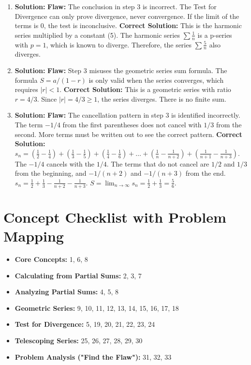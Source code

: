 \documentclass[12pt]{article}
\begin{document}
\begin{enumerate}
    \item \textbf{Solution:}
    \textbf{Flaw:} The conclusion in step 3 is incorrect. The Test for Divergence can only prove divergence, never convergence. If the limit of the terms is 0, the test is inconclusive.
    \textbf{Correct Solution:} This is the harmonic series multiplied by a constant (5). The harmonic series $\sum \frac{1}{n}$ is a p-series with $p=1$, which is known to diverge. Therefore, the series $\sum \frac{5}{n}$ also diverges.

    \item \textbf{Solution:}
    \textbf{Flaw:} Step 3 misuses the geometric series sum formula. The formula $S = a/(1-r)$ is only valid when the series converges, which requires $|r| < 1$.
    \textbf{Correct Solution:} This is a geometric series with ratio $r = 4/3$. Since $|r| = 4/3 \ge 1$, the series diverges. There is no finite sum.

    \item \textbf{Solution:}
    \textbf{Flaw:} The cancellation pattern in step 3 is identified incorrectly. The term $-1/4$ from the first parentheses does not cancel with $1/3$ from the second. More terms must be written out to see the correct pattern.
    \textbf{Correct Solution:}
    $s_n = (\frac{1}{2}-\frac{1}{4}) + (\frac{1}{3}-\frac{1}{5}) + (\frac{1}{4}-\frac{1}{6}) + \dots + (\frac{1}{n}-\frac{1}{n+2}) + (\frac{1}{n+1}-\frac{1}{n+3})$.
    The $-1/4$ cancels with the $1/4$. The terms that do not cancel are $1/2$ and $1/3$ from the beginning, and $-1/(n+2)$ and $-1/(n+3)$ from the end.
    $s_n = \frac{1}{2} + \frac{1}{3} - \frac{1}{n+2} - \frac{1}{n+3}$.
    $S = \lim_{n\to\infty} s_n = \frac{1}{2} + \frac{1}{3} = \frac{5}{6}$.

\end{enumerate}

\newpage
\section*{Concept Checklist with Problem Mapping}

\begin{itemize}
    \item \textbf{Core Concepts:} 1, 6, 8
    \item \textbf{Calculating from Partial Sums:} 2, 3, 7
    \item \textbf{Analyzing Partial Sums:} 4, 5, 8
    \item \textbf{Geometric Series:} 9, 10, 11, 12, 13, 14, 15, 16, 17, 18
    \item \textbf{Test for Divergence:} 5, 19, 20, 21, 22, 23, 24
    \item \textbf{Telescoping Series:} 25, 26, 27, 28, 29, 30
    \item \textbf{Problem Analysis ("Find the Flaw"):} 31, 32, 33
\end{itemize}
\end{document}
